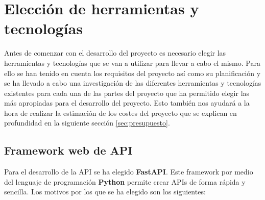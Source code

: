 \newpage

\section{Elección de herramientas y tecnologías}\label{sec:eleccion-de-herramientas-y-tecnologias}

Antes de comenzar con el desarrollo del proyecto es necesario elegir las herramientas y tecnologías que se van a
utilizar para llevar a cabo el mismo. Para ello se han tenido en cuenta los requisitos del proyecto así como su
planificación y se ha llevado a cabo una investigación de las diferentes herramientas y tecnologías
existentes para cada una de las partes del proyecto que ha permitido elegir las más apropiadas para el desarrollo
del proyecto. Esto también nos ayudará a la hora de realizar la estimación de los costes del proyecto que se
explican en profundidad en la siguiente sección \ref{sec:presupuesto}.

\subsection{Framework web de API}\label{subsec:framework-web-de-api}

Para el desarrollo de la API se ha elegido \textbf{FastAPI}. Este framework por medio del lenguaje
de programación \textbf{Python} permite crear APIs de forma rápida y sencilla. Los motivos por los que
se ha elegido son los siguientes:

